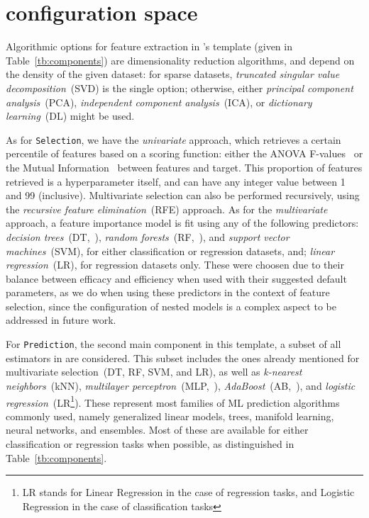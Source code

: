 \section{\isklearn configuration space}
\label{app:config-space}

Algorithmic options for feature extraction in \isklearn's template (given in Table~\ref{tb:components}) are dimensionality reduction algorithms, and depend on the density of the given dataset: for sparse datasets, \textit{truncated singular value decomposition}~(SVD) is the single option; otherwise, either \textit{principal component analysis}~(PCA), \textit{independent component analysis}~(ICA), or \textit{dictionary learning}~(DL) might be used.

As for \texttt{\small Selection}, we have the \textit{univariate} approach, which retrieves a certain percentile of features based on a scoring function: either the ANOVA F-values~\cite{anova} or the Mutual Information~\cite{mutual-info} between features and target. This proportion of features retrieved is a hyperparameter itself, and can have any integer value between 1 and 99 (inclusive). Multivariate selection can also be performed recursively, using the \textit{recursive feature elimination}~(RFE) approach. As for the \textit{multivariate} approach, a feature importance model is fit using any of the following predictors: \textit{decision trees}~(DT,~\cite{decisiontrees}), \textit{random forests}~(RF,~\cite{randomforests}), and \textit{support vector machines}~(SVM), for either classification or regression datasets, and; \textit{linear regression}~(LR), for regression datasets only. These were choosen due to their balance between efficacy and efficiency when used with their suggested default parameters, as we do when using these predictors in the context of feature selection, since the configuration of nested models is a complex aspect to be addressed in future work.

For \texttt{\small Prediction}, the second main component in this template, a subset of all estimators in \isklearn are considered. This subset includes the ones already mentioned for multivariate selection~(DT, RF, SVM, and LR), as well as \textit{k-nearest neighbors}~(kNN), \textit{multilayer perceptron}~(MLP,~\cite{mlp}), \textit{AdaBoost}~(AB,~\cite{adaboost}), and \textit{logistic regression}~(LR\footnote{LR stands for Linear Regression in the case of regression tasks, and Logistic Regression in the case of classification tasks}). These represent most families of ML prediction algorithms commonly used, namely generalized linear models, trees, manifold learning, neural networks, and ensembles. Most of these are available for either classification or regression tasks when possible, as distinguished in Table~\ref{tb:components}.

